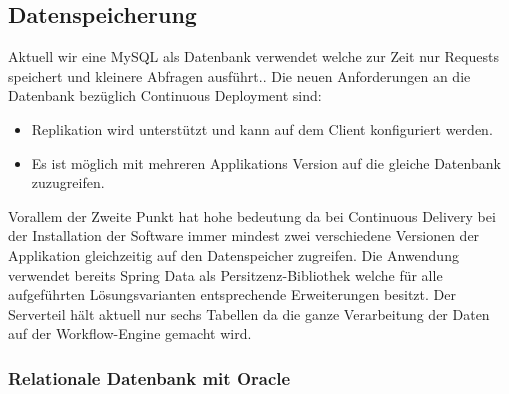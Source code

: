 \subsection{Datenspeicherung}

Aktuell wir eine MySQL als Datenbank verwendet welche zur Zeit nur Requests speichert und kleinere Abfragen ausführt.. Die neuen Anforderungen an die Datenbank bezüglich Continuous Deployment sind:
\begin{itemize}
	\item Replikation wird unterstützt und kann auf dem Client konfiguriert werden.
	\item Es ist möglich mit mehreren Applikations Version auf die gleiche Datenbank zuzugreifen.
\end{itemize}
Vorallem der Zweite Punkt hat hohe bedeutung da bei Continuous Delivery bei der Installation der Software immer mindest zwei verschiedene Versionen der Applikation gleichzeitig auf den Datenspeicher zugreifen. Die Anwendung verwendet bereits Spring Data als Persitzenz-Bibliothek welche für alle aufgeführten Lösungsvarianten entsprechende Erweiterungen besitzt. Der Serverteil hält aktuell nur sechs Tabellen da die ganze Verarbeitung der Daten auf der Workflow-Engine gemacht wird.

\subsubsection{Relationale Datenbank mit Oracle}

